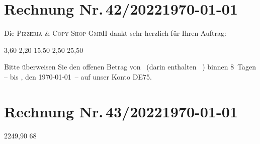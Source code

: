 \documentclass[12pt]{scrartcl}		%
\begin{document}
\section*{Rechnung Nr.\,42/2022\hfill\today}	%

Die \textsc{Pizzeria \& Copy Shop GmbH} dankt sehr herzlich für Ihren Auftrag:

	\begin{invoice*}[B]				%
		\NumbersOff					%
		\SeparatorOff				%
				{3,60}
			{2,20}
									{15,50}
							{2,50}
					{25,50}
	\end{invoice*}
	\def\payperiod{8}			%

Bitte überweisen Sie den offenen Betrag von 
\Total\ (darin enthalten \TaxAmnt ~\TaxAbrv) 
binnen \payperiod~Tagen – bis \DayName{\year}{\month}{\day+\payperiod}, 
den \AdvanceDate[\payperiod]\today\ – 
auf unser Konto DE75.

\AdvanceDate[-\payperiod]		%

\section*{Rechnung Nr.\,43/2022\hfill\today}
	\begin{invoice*}[N]				%
		\NumbersOff					%
		\SeparatorOff				%
				{2249,90}
							{68}
	\end{invoice*}
\end{document}
